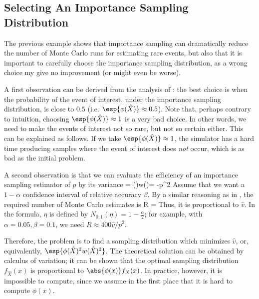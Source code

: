 \subsection{Selecting An Importance Sampling Distribution}
The previous example shows that importance sampling can dramatically
reduce the number of Monte Carlo runs for estimating rare events,
but also that it is important to carefully choose the importance
sampling distribution, as a wrong choice my give no improvement (or
might even be worse).

A first observation can be derived from the analysis of
: the best choice is when the probability of
the event of interest, under the importance sampling
distribution, is close to $0.5$ (i.e.
$\esp{\phi(\hat{X})}\approx 0.5$). Note that, perhaps contrary
to intuition, choosing $\esp{\phi(\hat{X})}\approx 1$ is a very
bad choice. In other words, we need to make the events of
interest not so rare, but not so certain either. This can be
explained as follows. If we take $\esp{\phi(\hat{X})}\approx
1$, the simulator has a hard time producing samples where the
event of interest does \emph{not} occur, which is as bad as the
initial problem.

A second observation is that we can evaluate the efficiency of
an importance sampling estimator of $p$ by its variance \ben
{} = \var \lp \phi()w()\rp =
-p^2
 \een
Assume that we want a $1-\alpha$ confidence interval
 of relative accuracy $\beta$. By a similar reasoning as in , the
required number of Monte Carlo estimates is
 \be
 R =    \label{eq-is41}
 \ee
Thus, it is proportional to $\hat{v}$. In the formula, $\eta$ is
defined by $N_{0,1}(\eta)=1-\frac{\alpha}{2}$; for example, with
$\alpha= 0.05, \beta= 0.1$, we need
 $R \approx 40 0  \hat{v}/p^2$.

 Therefore, the problem is to find a sampling distribution which
 minimizes $\hat{v}$, or, equivalently, $\esp{\phi(\hat{X})^2w(\hat{X})^2} $.
 The theoretical solution can be
obtained by calculus of variation; it can be shown that the optimal
sampling distribution $f_{\hat{X}}(x)$ is proportional to
$\abs{\phi(x)}f_{X}(x)$. In practice, however, it is impossible to
compute, since we assume in the first place that it is hard to
compute $\phi(x)$.

